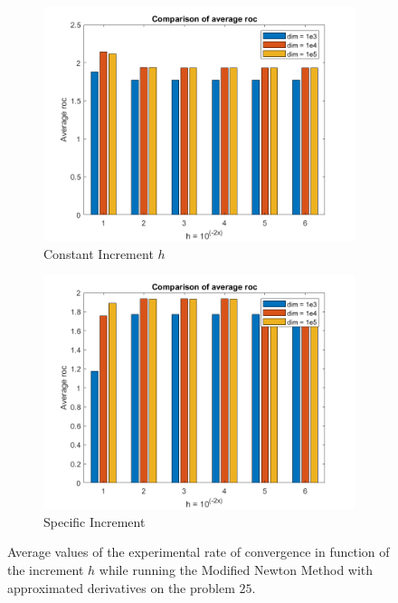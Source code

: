 \begin{figure}[htbp]
    \centering
    \begin{subfigure}[t]{0.45\textwidth}  %
        \centering
        \includegraphics[width=\textwidth]{img/pb76_MN_difffinite_COST_rateofconv.png}
        \caption{Constant Increment $h$}
    \end{subfigure}
    \hspace{1cm} %
    \begin{subfigure}[t]{0.45\textwidth}
        \centering
        \includegraphics[width=\textwidth]{img/pb76_MN_difffinite_REL_rateofconv.png}
        \caption{Specific Increment }
    \end{subfigure}
    \caption{ \small Average values of the experimental rate of convergence in function of the increment $h$  while running the Modified Newton Method with approximated derivatives on the problem $25$.}
    \label{25roc}
\end{figure}


